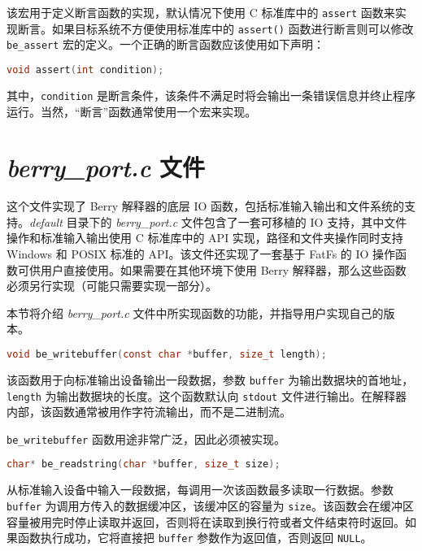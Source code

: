 
该宏用于定义断言函数的实现，默认情况下使用 C 标准库中的 \texttt{assert} 函数来实现断言。如果目标系统不方便使用标准库中的 \texttt{assert()} 函数进行断言则可以修改 \texttt{be\_assert} 宏的定义。一个正确的断言函数应该使用如下声明：

\begin{lstlisting}[language=c, numbers=none]
void assert(int condition);
\end{lstlisting}

其中，\texttt{condition} 是断言条件，该条件不满足时将会输出一条错误信息并终止程序运行。当然，“断言”函数通常使用一个宏来实现。

\section{\textsl{berry\_port.c} 文件}

这个文件实现了 Berry 解释器的底层 IO 函数，包括标准输入输出和文件系统的支持。\textsl{default} 目录下的 \textsl{berry\_port.c} 文件包含了一套可移植的 IO 支持，其中文件操作和标准输入输出使用 C 标准库中的 API 实现，路径和文件夹操作同时支持 Windows 和 POSIX 标准的 API。该文件还实现了一套基于 FatFs 的 IO 操作函数可供用户直接使用。如果需要在其他环境下使用 Berry 解释器，那么这些函数必须另行实现（可能只需要实现一部分）。

本节将介绍 \textsl{berry\_port.c} 文件中所实现函数的功能，并指导用户实现自己的版本。


\begin{lstlisting}[language=c, numbers=none]
void be_writebuffer(const char *buffer, size_t length);
\end{lstlisting}

该函数用于向标准输出设备输出一段数据，参数 \texttt{buffer} 为输出数据块的首地址，\texttt{length} 为输出数据块的长度。这个函数默认向 \texttt{stdout} 文件进行输出。在解释器内部，该函数通常被用作字符流输出，而不是二进制流。

\texttt{be\_writebuffer} 函数用途非常广泛，因此必须被实现。


\begin{lstlisting}[language=c, numbers=none]
char* be_readstring(char *buffer, size_t size);
\end{lstlisting}

从标准输入设备中输入一段数据，每调用一次该函数最多读取一行数据。参数 \texttt{buffer} 为调用方传入的数据缓冲区，该缓冲区的容量为 \texttt{size}。该函数会在缓冲区容量被用完时停止读取并返回，否则将在读取到换行符或者文件结束符时返回。如果函数执行成功，它将直接把 \texttt{buffer} 参数作为返回值，否则返回 \texttt{NULL}。

